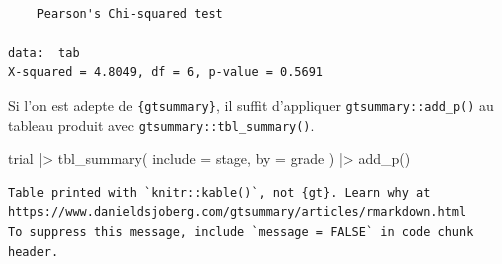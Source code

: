 \documentclass[
  letterpaper,
  DIV=11,
  numbers=noendperiod,
  oneside]{scrreprt}
\newenvironment{Shaded}{\begin{snugshade}}{\end{snugshade}}
\newcommand{\AttributeTok}[1]{\textcolor[rgb]{0.40,0.45,0.13}{#1}}
\newcommand{\FunctionTok}[1]{\textcolor[rgb]{0.28,0.35,0.67}{#1}}
\newcommand{\NormalTok}[1]{\textcolor[rgb]{0.00,0.23,0.31}{#1}}
\newcommand{\SpecialCharTok}[1]{\textcolor[rgb]{0.37,0.37,0.37}{#1}}
\begin{document}
\begin{verbatim}

    Pearson's Chi-squared test

data:  tab
X-squared = 4.8049, df = 6, p-value = 0.5691
\end{verbatim}

Si l'on est adepte de \texttt{\{gtsummary\}}, il suffit d'appliquer
\texttt{gtsummary::add\_p()} au tableau produit avec
\texttt{gtsummary::tbl\_summary()}.

\begin{Shaded}
\begin{Highlighting}[]
\NormalTok{trial }\SpecialCharTok{|\textgreater{}} 
  \FunctionTok{tbl\_summary}\NormalTok{(}
    \AttributeTok{include =}\NormalTok{ stage,}
    \AttributeTok{by =}\NormalTok{ grade}
\NormalTok{  ) }\SpecialCharTok{|\textgreater{}} 
  \FunctionTok{add\_p}\NormalTok{()}
\end{Highlighting}
\end{Shaded}

\begin{verbatim}
Table printed with `knitr::kable()`, not {gt}. Learn why at
https://www.danieldsjoberg.com/gtsummary/articles/rmarkdown.html
To suppress this message, include `message = FALSE` in code chunk header.
\end{verbatim}
\end{document}
